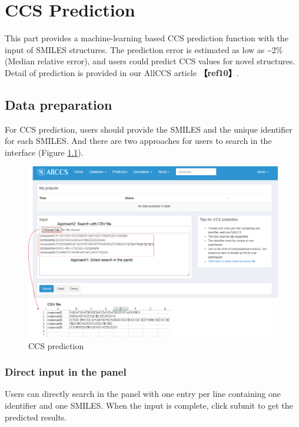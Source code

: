 \documentclass[12pt,]{book}
\theoremstyle{definition}
\theoremstyle{definition}
\theoremstyle{definition}
\theoremstyle{remark}
\begin{document}
\chapter{CCS Prediction}\label{chapter3}

This part provides a machine-learning based CCS prediction function with
the input of SMILES structures. The prediction error is estimated as low
as \textasciitilde{}2\% (Median relative error), and users could predict
CCS values for novel structures. Detail of prediction is provided in our
AllCCS article \textbf{【ref10】}.

\section{Data preparation}\label{chapter3d1}

For CCS prediction, users should provide the SMILES and the unique
identifier for each SMILES. And there are two approaches for users to
search in the interface (Figure \ref{fig:figure3d1}).

\begin{figure}

{\centering \includegraphics{images/chapter3/figure3.1prediction} 

}

\caption{CCS prediction}\label{fig:figure3d1}
\end{figure}

\subsection{Direct input in the panel}\label{chapter3d1d1}

Users can directly search in the panel with one entry per line
containing one identifier and one SMILES. When the input is complete,
click submit to get the predicted results.
\end{document}

